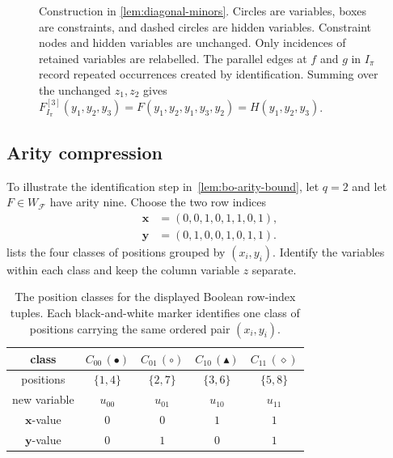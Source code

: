 \documentclass[11pt,letterpaper,onecolumn]{article}
\theoremstyle{plain}
\theoremstyle{definition}
\theoremstyle{remark}
\newcommand{\cF}{\mathcal F}
\begin{document}
\begin{figure}[!htbp]
{%
  }
  \caption{Construction in \cref{lem:diagonal-minors}.  Circles are
  variables, boxes are constraints, and dashed circles are hidden variables.
  Constraint nodes and hidden variables are unchanged. Only incidences of
  retained variables are relabelled.  The parallel edges at $f$ and $g$ in
  $I_\pi$ record repeated occurrences created by identification.  Summing
  over the unchanged $z_1,z_2$ gives
  $F_{I_\pi}^{[3]}(y_1,y_2,y_3)
   =F(y_1,y_2,y_1,y_3,y_2)=H(y_1,y_2,y_3)$.}
  \label{fig:diagonal-minor-example}
\end{figure}

\subsection{Arity compression}
\label{app:arity-compression-example}

To illustrate the identification step in~\cref{lem:bo-arity-bound}, let
$q=2$ and let $F\in W_{\cF}$ have arity nine.  Choose the two row indices
\[
\begin{aligned}
  \mathbf x&=(0,0,1,0,1,1,0,1),\\
  \mathbf y&=(0,1,0,0,1,0,1,1).
\end{aligned}
\]
 lists the four classes of positions
grouped by $(x_i,y_i)$.  Identify the variables within each class and
keep the column variable $z$ separate.

\begin{table}[!htbp]
  \centering
  \small
  \setlength{\tabcolsep}{3.6pt}
  \renewcommand{\arraystretch}{1.18}
  \begin{tabular}{c|cccc}
    class
      &$C_{00}\,(\bullet)$
      &$C_{01}\,(\circ)$
      &$C_{10}\,(\blacktriangle)$
      &$C_{11}\,(\diamond)$\\ \hline
    positions &$\{1,4\}$&$\{2,7\}$&$\{3,6\}$&$\{5,8\}$\\
    new variable &$u_{00}$&$u_{01}$&$u_{10}$&$u_{11}$\\
    $\mathbf x$-value &$0$&$0$&$1$&$1$\\
    $\mathbf y$-value &$0$&$1$&$0$&$1$
  \end{tabular}
  \caption{The position classes for the displayed Boolean row-index tuples.  Each
  black-and-white marker identifies one class of positions carrying the same
  ordered pair $(x_i,y_i)$.}
  \label{tab:pair-class-example}
\end{table}
\end{document}
